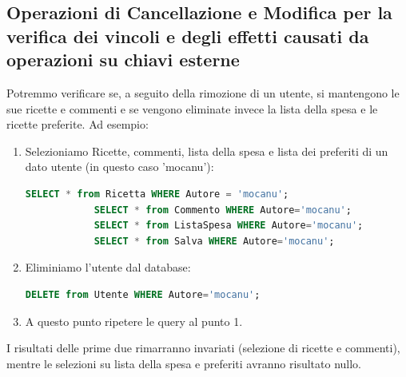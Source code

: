 \documentclass[12pt]{extarticle}
\begin{document}
\subsection{Operazioni di Cancellazione e Modifica per la verifica dei vincoli e degli effetti causati da operazioni su chiavi esterne}
Potremmo verificare se, a seguito della rimozione di un utente, si mantengono le sue
ricette e commenti e se vengono eliminate invece la lista della spesa e le ricette preferite.
Ad esempio:
\begin{enumerate}
    \item Selezioniamo Ricette, commenti, lista della spesa e lista dei preferiti di un dato
    utente (in questo caso 'mocanu'):
        \begin{lstlisting}[language=SQL]
            SELECT * from Ricetta WHERE Autore = 'mocanu';
            SELECT * from Commento WHERE Autore='mocanu';
            SELECT * from ListaSpesa WHERE Autore='mocanu';
            SELECT * from Salva WHERE Autore='mocanu';
        \end{lstlisting}
    \item Eliminiamo l'utente dal database:
        \begin{lstlisting}[language=SQL]
            DELETE from Utente WHERE Autore='mocanu';
        \end{lstlisting}
    \item A questo punto ripetere le query al punto 1.
    
\end{enumerate}

I risultati delle prime due rimarranno invariati (selezione di ricette e commenti),
mentre le selezioni su lista della spesa e preferiti avranno risultato nullo.
\end{document}
